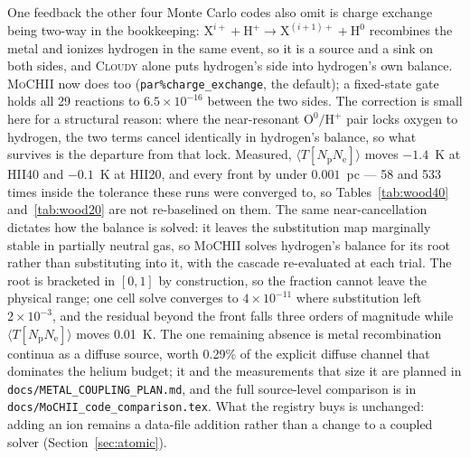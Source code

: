 \documentclass[twocolumn,linenumbers]{aastex702}
\newcommand{\code}[1]{\texttt{#1}}
\newcommand{\MoCHII}{\textsc{MoCHII}}
\begin{document}
One feedback the other four Monte Carlo codes also omit is charge exchange
being two-way in the bookkeeping:
$\mathrm{X}^{i+} + \mathrm{H}^{+} \to \mathrm{X}^{(i+1)+} + \mathrm{H}^{0}$
recombines the metal and ionizes hydrogen in the same event, so it is a source
and a sink on both sides, and \textsc{Cloudy} alone puts hydrogen's side into
hydrogen's own balance.  \MoCHII{} now does too
(\code{par\%charge\_exchange}, the default); a fixed-state gate holds all 29
reactions to $6.5\times10^{-16}$ between the two sides.  The correction is
small here for a structural reason: where the near-resonant
$\mathrm{O}^{0}/\mathrm{H}^{+}$ pair locks oxygen to hydrogen, the two terms
cancel identically in hydrogen's balance, so what survives is the departure
from that lock.  Measured,
$\langle T[N_{\mathrm{p}}N_{\mathrm{e}}]\rangle$ moves $-1.4$~K at HII40 and
$-0.1$~K at HII20, and every front by under $0.001$~pc --- 58 and 533 times
inside the tolerance these runs were converged to, so
Tables~\ref{tab:wood40} and~\ref{tab:wood20} are not re-baselined on them.
The same near-cancellation dictates how the balance is solved: it leaves the
substitution map marginally stable in partially neutral gas, so \MoCHII{}
solves hydrogen's balance for its root rather than substituting into it, with
the cascade re-evaluated at each trial.  The root is bracketed in $[0,1]$ by
construction, so the fraction cannot leave the physical range; one cell solve
converges to $4\times10^{-11}$ where substitution left $2\times10^{-3}$, and
the residual beyond the front falls three orders of magnitude while
$\langle T[N_{\mathrm{p}}N_{\mathrm{e}}]\rangle$ moves 0.01~K.  The one
remaining absence is metal recombination continua as a diffuse source, worth
0.29\% of the explicit diffuse channel that dominates the helium budget; it
and the measurements that size it are planned in
\code{docs/METAL\_COUPLING\_PLAN.md}, and the full source-level comparison is
in \code{docs/MoCHII\_code\_comparison.tex}.  What the registry buys is
unchanged: adding an ion remains a data-file addition rather than a change to
a coupled solver (Section~\ref{sec:atomic}).
\end{document}
